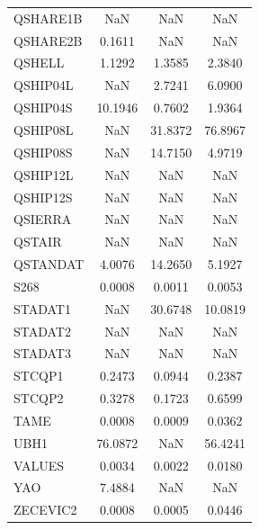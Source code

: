 \begin{longtable}{lccc}
QSHARE1B &      NaN &      NaN &      NaN \\
QSHARE2B &   0.1611 &      NaN &      NaN \\
QSHELL   &   1.1292 &   1.3585 &   2.3840 \\
QSHIP04L &      NaN &   2.7241 &   6.0900 \\
QSHIP04S &  10.1946 &   0.7602 &   1.9364 \\
QSHIP08L &      NaN &  31.8372 &  76.8967 \\
QSHIP08S &      NaN &  14.7150 &   4.9719 \\
QSHIP12L &      NaN &      NaN &      NaN \\
QSHIP12S &      NaN &      NaN &      NaN \\
QSIERRA  &      NaN &      NaN &      NaN \\
QSTAIR   &      NaN &      NaN &      NaN \\
QSTANDAT &   4.0076 &  14.2650 &   5.1927 \\
S268     &   0.0008 &   0.0011 &   0.0053 \\
STADAT1  &      NaN &  30.6748 &  10.0819 \\
STADAT2  &      NaN &      NaN &      NaN \\
STADAT3  &      NaN &      NaN &      NaN \\
STCQP1   &   0.2473 &   0.0944 &   0.2387 \\
STCQP2   &   0.3278 &   0.1723 &   0.6599 \\
TAME     &   0.0008 &   0.0009 &   0.0362 \\
UBH1     &  76.0872 &      NaN &  56.4241 \\
VALUES   &   0.0034 &   0.0022 &   0.0180 \\
YAO      &   7.4884 &      NaN &      NaN \\
ZECEVIC2 &   0.0008 &   0.0005 &   0.0446 \\
\end{longtable}
